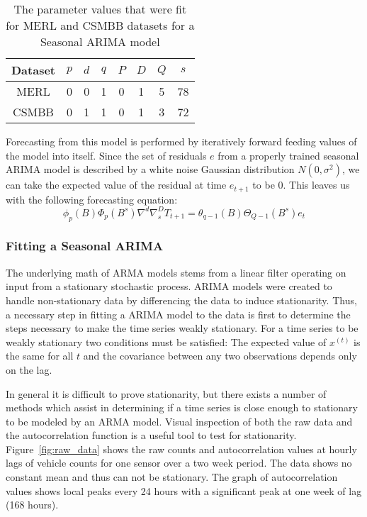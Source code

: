 \begin{table}[t]
\centering
\caption{The parameter values that were fit for MERL and CSMBB datasets for a Seasonal ARIMA model}
\begin{tabular}{|c|c|c|c|c|c|c|c|} \hline
Dataset & $p$ & $d$ & $q$ & $P$ & $D$ & $Q$ & $s$\\ \hline
MERL & 0 & 0 & 1 & 0 & 1 & 5 & 78\\ \hline
CSMBB & 0 & 1 & 1 & 0 & 1 & 3 & 72\\ \hline
\end{tabular}
\label{fig:sarimatab}
\end{table}

Forecasting from this model is performed by iteratively forward feeding values of the model into itself.  Since the set of residuals $e$ from a properly trained seasonal ARIMA model is described by a white noise Gaussian distribution $N(0, \sigma^{2})$, we can take the expected value of the residual at time $e_{t + 1}$ to be 0.  This leaves us with the following forecasting equation: 
\begin{equation}
\label{eq:sarima}
\phi_{p}(B)\Phi_{p}(B^{s})\nabla^{d}\nabla^{D}_{s}T_{t + 1} = \theta_{q - 1}(B)\Theta_{Q - 1}(B^{s})e_{t}
\end{equation}

\subsubsection{Fitting a Seasonal ARIMA}
The underlying math of ARMA models stems from a linear filter operating on input from a stationary stochastic process.  ARIMA models were created to handle non-stationary data by differencing the data to induce stationarity.  Thus, a necessary step in fitting a ARIMA model to the data is first to determine the steps necessary to make the time series weakly stationary.  For a time series to be weakly stationary two conditions must be satisfied: The expected value of $x^{(t)}$ is the same for all $t$ and the covariance between any two observations depends only on the lag.  

In general it is difficult to prove stationarity, but there exists a number of methods which assist in determining if a time series is close enough to stationary to be modeled by an ARMA model.  Visual inspection of both the raw data and the autocorrelation function is a useful tool to test for stationarity.  Figure~\ref{fig:raw_data} shows the raw counts and autocorrelation values at hourly lags of vehicle counts for one sensor over a two week period.  The data shows no constant mean and thus can not be stationary.  The graph of autocorrelation values shows local peaks every 24 hours with a significant peak at one week of lag (168 hours).

